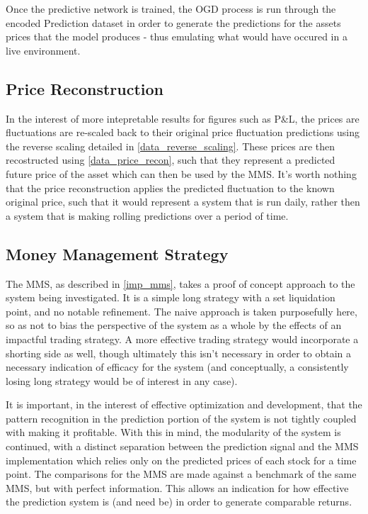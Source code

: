 \documentclass[a4paper,11pt,oneside]{article}
\theoremstyle{plain}
\theoremstyle{definition}
\begin{document}
Once the predictive network is trained, the OGD process is run through the encoded Prediction dataset in order to generate the predictions for the assets prices that the model produces - thus emulating what would have occured in a live environment. \newline

\subsection{Price Reconstruction}\label{proc_precerecon}

In the interest of more intepretable results for figures such as P\&L, the prices are fluctuations are re-scaled back to their original price fluctuation predictions using the reverse scaling detailed in \ref{data_reverse_scaling}. These prices are then recostructed using \ref{data_price_recon}, such that they represent a predicted future price of the asset which can then be used by the MMS. It's worth nothing that the price reconstruction applies the predicted fluctuation to the known original price, such that it would represent a system that is run daily, rather then a system that is making rolling predictions over a period of time.

\subsection{Money Management Strategy}\label{proc_mms}

The MMS, as described in \ref{imp_mms}, takes a proof of concept approach to the system being investigated. It is a simple long strategy with a set liquidation point, and no notable refinement. The naive approach is taken purposefully here, so as not to bias the perspective of the system as a whole by the effects of an impactful trading strategy. A more effective trading strategy would incorporate a shorting side as well, though ultimately this isn't necessary in order to obtain a necessary indication of efficacy for the system (and conceptually, a consistently losing long strategy would be of interest in any case).  \newline

It is important, in the interest of effective optimization and development, that the pattern recognition in the prediction portion of the system is not tightly coupled with making it profitable. With this in mind, the modularity of the system is continued, with a distinct separation between the prediction signal and the MMS implementation which relies only on the predicted prices of each stock for a time point. The comparisons for the MMS are made against a benchmark of the same MMS, but with perfect information. This allows an indication for how effective the prediction system is (and need be) in order to generate comparable returns. \newline {}
\end{document}
